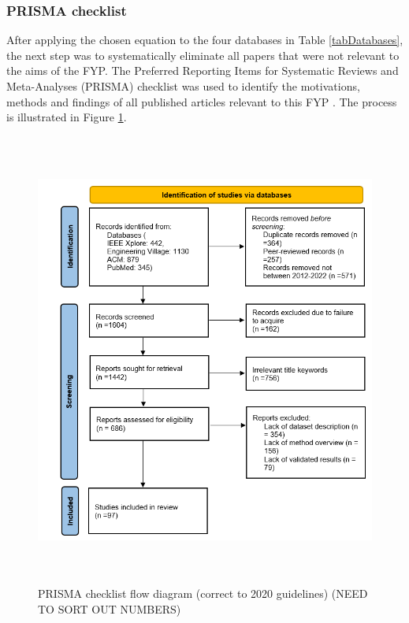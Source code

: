 \subsubsection{PRISMA checklist}
After applying the chosen equation to the four databases in Table \ref{tabDatabases}, the next step was to systematically eliminate all papers that 
were not relevant to the aims of the FYP. The Preferred Reporting Items for Systematic Reviews and Meta-Analyses (PRISMA) checklist was used to identify the 
motivations, methods and findings of all published articles relevant to this FYP \cite{prisma}. The process is illustrated in Figure \ref{prisma}.
\begin{figure}[H]
  \centering
  \includegraphics[width=15cm,height=15cm,keepaspectratio]{Background/prisma.png}
  \caption{PRISMA checklist flow diagram (correct to 2020 guidelines) (NEED TO SORT OUT NUMBERS)}
  \label{prisma}
\end{figure} 

